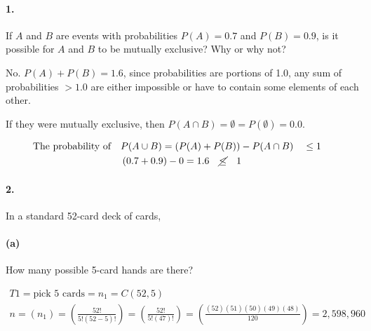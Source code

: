 

\renewcommand\assignment{Worksheet 5, due Monday January 30, 4:15pm}

\def\firstcircle{(0:1.75cm) circle (2.5cm)}
\def\secondcircle{(180:1.75cm) circle (2.5cm)}



    \paragraph*{1.}
    If $A$ and $B$ are events with probabilities $P (A) = 0.7$ and $P (B) = 0.9$, is it possible for $A$ and $B$ to be mutually exclusive? Why or why not?
    
    \begin{mdframed}
        No. $P(A) + P(B) = 1.6$, since probabilities are portions of 1.0, any sum of probabilities $> 1.0$ are either impossible or have to contain some elements of each other.

        If they were mutually exclusive, then $P(A \cap B) = \emptyset = P(\emptyset) = 0.0$.

        \begin{equation*}
            \begin{gathered}
                \text{The probability of} \quad P(A \cup B) = (P(A) + P(B)) - P(A \cap B) \quad \leq 1 \quad    \\
                (0.7 + 0.9) - 0 = 1.6 \quad \cancel{\leq} \quad 1
            \end{gathered}
        \end{equation*}
        
        
    \end{mdframed}

    \paragraph*{2.}
    In a standard 52-card deck of cards,

    \paragraph*{(a)}
    How many possible 5-card hands are there?

    \begin{mdframed}
        \begin{equation*}
            \begin{gathered}
                T1 = \text{pick 5 cards} = n_1  = C(52,5)  \\
                n = (n_1) = \left(\frac{52!}{5!(52-5)!}\right) = \left(\frac{52!}{5!(47)!}\right) = \left(\frac{(52)(51)(50)(49)(48)}{120}\right) = \boxed{2,598,960}
            \end{gathered}
        \end{equation*}
    \end{mdframed}

